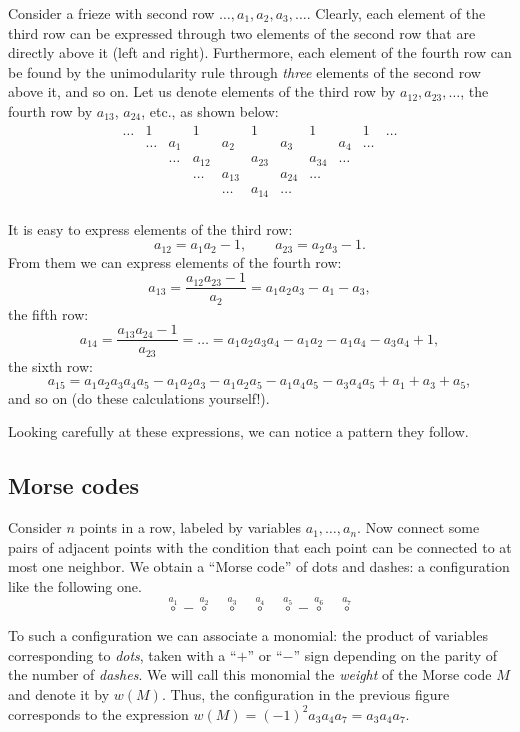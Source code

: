 \documentclass[a4paper,11pt]{amsart}
\theoremstyle{plain}
\theoremstyle{remark}
\theoremstyle{definition}
\numberwithin{equation}{section}
\numberwithin{figure}{section}
\begin{document}
Consider a frieze with second row $\dots,a_1,a_2,a_3,\dots$. Clearly, each element of the third row can be expressed through two elements of the second row that are directly above it (left and right). Furthermore, each element of the fourth row can be found by the unimodularity rule through \emph{three} elements of the second row above it, and so on. Let us denote elements of the third row by $a_{12},a_{23},\dots$, the fourth row by $a_{13}$, $a_{24}$, etc., as shown below:
\[
\begin{array}{ccccccccccccccccccccc}
\dots &1 && 1&& 1&& 1& &1&\dots\\
&\dots & a_1 && a_2  && a_3 &&a_4 & \dots\\
&& \dots & a_{12} && a_{23} && a_{34} &\dots\\
&&&\dots & a_{13}& &a_{24}& \dots \\
&&&&\dots & a_{14} &\dots\\
\end{array}
\]

It is easy to express elements of the third row:
\[
a_{12}=a_1a_2-1,\qquad a_{23}=a_2a_3-1.
\]
From them we can express elements of the fourth row:
\[
a_{13}=\frac{a_{12}a_{23}-1}{a_2}=a_1a_2a_3-a_1-a_3,
\]
the fifth row:
\[
a_{14}=\frac{a_{13}a_{24}-1}{a_{23}}=\dots=a_1a_2a_3a_4-a_1a_2-a_1a_4-a_3a_4+1,
\]
the sixth row:
\[
a_{15}=a_1a_2a_3a_4a_5-a_1a_2a_3-a_1a_2a_5-a_1a_4a_5-a_3a_4a_5+a_1+a_3+a_5,
\]
and so on (do these calculations yourself!).

Looking carefully at these expressions, we can notice a pattern they follow.

\subsection{Morse codes}\label{ssec:morse}

Consider $n$ points in a row, labeled by variables $a_1,\dots,a_n$. Now connect some pairs of adjacent points with the condition that each point can be connected to at most one neighbor. We obtain a ``Morse code'' of dots and dashes: a configuration like the following one.
\[
\stackrel{a_1}{\circ}-\stackrel{a_2}{\circ}\quad\stackrel{a_3}{\circ}\quad\stackrel{a_4}{\circ}\quad\stackrel{a_5}{\circ}-\stackrel{a_6}{\circ}\quad\stackrel{a_7}{\circ}
\]

To such a configuration we can associate a monomial: the product of variables corresponding to \emph{dots}, taken with a ``$+$'' or ``$-$'' sign depending on the parity of the number of \emph{dashes}. We will call this monomial the \emph{weight} of the Morse code $M$ and denote it by $w(M)$. Thus, the configuration in the previous figure corresponds to the expression $w(M)=(-1)^2a_3a_4a_7=a_3a_4a_7$.
\end{document}
